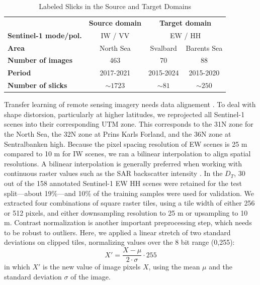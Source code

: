 \documentclass[journal]{IEEEtran}
\begin{document}
\begin{table}[!t]
    \caption{Labeled Slicks in the Source and Target Domains}
    \label{table1}
    \centering
    \begin{tabular}{lcc|cc}
        \toprule
        & \multicolumn{2}{c}{\textbf{Source domain}} & \multicolumn{2}{c}{\textbf{Target domain}} \\
        \cmidrule(lr){2-3} \cmidrule(lr){4-5}
        \textbf{Sentinel-1 mode/pol.} & \multicolumn{2}{c}{IW / VV} & \multicolumn{2}{c}{EW / HH} \\
        \midrule
        \textbf{Area} & \multicolumn{2}{c}{North Sea} & Svalbard & Barents Sea \\
        \textbf{Number of images} & \multicolumn{2}{c}{463} & 70 & 88 \\
        \textbf{Period} & \multicolumn{2}{c}{2017-2021} & 2015-2024 & 2015-2020 \\
        \textbf{Number of slicks} & \multicolumn{2}{c}{$\sim 1723$} & $\sim 81$ & $\sim 250$ \\
        \bottomrule
    \end{tabular}
\end{table}

Transfer learning of remote sensing imagery needs data alignement \cite{tuiaDomainAdaptationClassification2016}. To deal with shape distorsion, particularly at higher latitudes, we reprojected 
all Sentinel-1 scenes into their corresponding UTM zone. This corresponds to the 31N zone for the North Sea, the 32N zone at Prins Karls Forland, and the 36N zone at Sentralbanken high. 
Because the pixel spacing resolution of EW scenes is 25 m compared to 10 m for IW scenes, we ran a bilinear interpolation to align spatial resolutions. A bilinear interpolation is 
generally preferred when working with continuous raster values such as the SAR backscatter intensity \cite{schowengerdtRemoteSensingModels2006}. In the $\mathit{D}_T$, 30 out of the 158 annotated Sentinel-1 EW HH scenes were retained for the test 
split—about 19\%—and 10\% of the training samples were used for validation. We extracted four combinations of square raster tiles, using a tile width of either 256 or 512 pixels, and either downsampling 
resolution to 25 m or upsampling to 10 m. Contrast normalization is another important preprocessing step, which needs to be robust to outliers\cite{goodfellowDeepLearning2016,schowengerdtRemoteSensingModels2006}. 
Here, we applied a linear stretch of two standard deviations on clipped tiles, normalizing values over the 8 bit range (0,255):
\begin{equation}
    X' = \frac{X - \mu }{2 \cdot \sigma} \cdot 255
\end{equation}
in which \( X' \) is the new value of image pixels \( X \), using the mean \( \mu \) and the standard deviation \( \sigma \) of the image.
\end{document}
